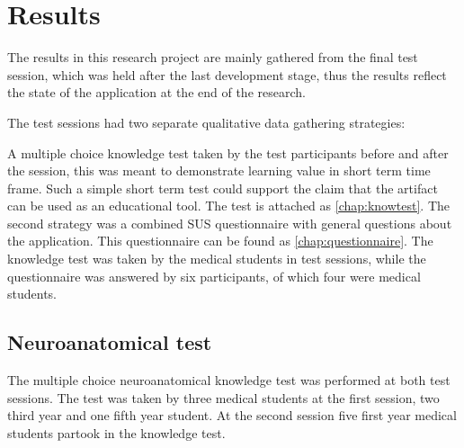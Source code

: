 


\chapter{Results}\label{chap:results}




The results in this research project are mainly gathered from the final test session, which was held after the last development stage, thus the results reflect the state of the application at the end of the research. 

The test sessions had two separate qualitative data gathering strategies: 

A multiple choice knowledge test taken by the test participants before and after the session,  this was meant to demonstrate learning value in short term time frame. Such a simple short term test could support the claim that the artifact can be used as an educational tool. The test is attached as \autoref{chap:knowtest}.
The second strategy was a combined SUS questionnaire with general questions about the application. This questionnaire can be found as \autoref{chap:questionnaire}.
The knowledge test was taken by the medical students in test sessions, while the questionnaire was answered by six participants, of which four were medical students.


\section{Neuroanatomical test}
The multiple choice neuroanatomical knowledge test was performed at both test sessions. The test was taken by three medical students at the first session, two third year and one fifth year student. At the second session five first year medical students partook in the knowledge test.

